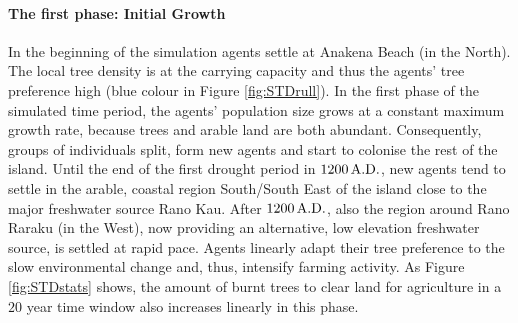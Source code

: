 \paragraph{The first phase: Initial Growth}
In the beginning of the simulation agents settle at Anakena Beach (in the North). 
The local tree density is at the carrying capacity and thus the agents' tree preference high (blue colour in Figure \ref{fig:STDrull}).
In the first phase of the simulated time period, the agents' population size grows at a constant maximum growth rate, because trees and arable land are both abundant. 
Consequently, groups of individuals split, form new agents and start to colonise the rest of the island. %
Until the end of the first drought period in $1200\, {\rm A.D.}$, new agents tend to settle in the arable, coastal region South/South East of the island close to the major freshwater source Rano Kau. 
After $1200\, {\rm A.D.}$, also the region around Rano Raraku (in the West), now providing an alternative, low elevation freshwater source, is settled at rapid pace.
Agents linearly adapt their tree preference to the slow environmental change and, thus, intensify farming activity.
As Figure \ref{fig:STDstats} shows, the amount of burnt trees to clear land for agriculture in a $20$ year time window also increases linearly in this phase.

